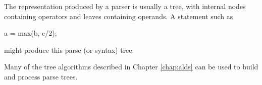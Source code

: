 The representation produced by a parser is usually a tree, with internal
nodes containing operators and leaves containing operands. A statement such
as
\begin{wellcode}
    a = max(b, c/2);
\end{wellcode}
might produce this parse (or syntax) tree:
\begin{center}
\end{center}
Many of the tree algorithms described in Chapter \ref{chap:alds} can be
used to build and process parse trees.

